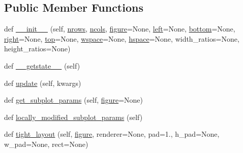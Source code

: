 \subsection*{Public Member Functions}
\begin{DoxyCompactItemize}
\item 
def \hyperlink{classmatplotlib_1_1gridspec_1_1GridSpec_a6b6d1ea08e2bdae57c90672630992b3f}{\+\_\+\+\_\+init\+\_\+\+\_\+} (self, \hyperlink{classmatplotlib_1_1gridspec_1_1GridSpecBase_a610c62c29d638e1ed969419091c97f74}{nrows}, \hyperlink{classmatplotlib_1_1gridspec_1_1GridSpecBase_ad86cfae5903f2bf4e2fc878fd39461f3}{ncols}, \hyperlink{classmatplotlib_1_1gridspec_1_1GridSpec_afc36985760fb67f8247aaa24a2231212}{figure}=None, \hyperlink{classmatplotlib_1_1gridspec_1_1GridSpec_ac62505d756799082ce1c44951e12572b}{left}=None, \hyperlink{classmatplotlib_1_1gridspec_1_1GridSpec_a4fa176d6ccc57ebf0beebe077042b926}{bottom}=None, \hyperlink{classmatplotlib_1_1gridspec_1_1GridSpec_abe67484566b1af530a74a8e7f9381b0b}{right}=None, \hyperlink{classmatplotlib_1_1gridspec_1_1GridSpec_acb003c42bfa2a94d9ea12949a06af0ac}{top}=None, \hyperlink{classmatplotlib_1_1gridspec_1_1GridSpec_acb3157430c1133f037b691123d635a54}{wspace}=None, \hyperlink{classmatplotlib_1_1gridspec_1_1GridSpec_a2d426ae9004bf716c5af8785c1a01807}{hspace}=None, width\+\_\+ratios=None, height\+\_\+ratios=None)
\item 
def \hyperlink{classmatplotlib_1_1gridspec_1_1GridSpec_a191f90ac11f52f7e92f671fa75b445d3}{\+\_\+\+\_\+getstate\+\_\+\+\_\+} (self)
\item 
def \hyperlink{classmatplotlib_1_1gridspec_1_1GridSpec_a07c6d70d1274f35fc20dc8b5722b7aa6}{update} (self, kwargs)
\item 
def \hyperlink{classmatplotlib_1_1gridspec_1_1GridSpec_aa230048f2158c377ddea9a771109e828}{get\+\_\+subplot\+\_\+params} (self, \hyperlink{classmatplotlib_1_1gridspec_1_1GridSpec_afc36985760fb67f8247aaa24a2231212}{figure}=None)
\item 
def \hyperlink{classmatplotlib_1_1gridspec_1_1GridSpec_a8686f0b7e6bf5f6922d347ea035b8055}{locally\+\_\+modified\+\_\+subplot\+\_\+params} (self)
\item 
def \hyperlink{classmatplotlib_1_1gridspec_1_1GridSpec_aaa4d91ae963ea777067223fdb7c0dfd1}{tight\+\_\+layout} (self, \hyperlink{classmatplotlib_1_1gridspec_1_1GridSpec_afc36985760fb67f8247aaa24a2231212}{figure}, renderer=None, pad=1., h\+\_\+pad=None, w\+\_\+pad=None, rect=None)
\end{DoxyCompactItemize}
